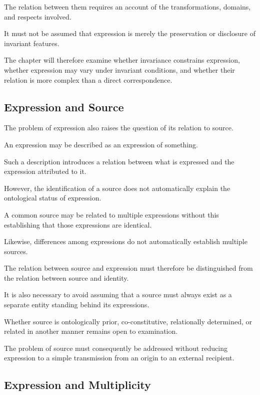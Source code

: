 The relation between them requires
an account of the transformations,
domains, and respects involved.

It must not be assumed that expression
is merely the preservation or disclosure
of invariant features.

The chapter will therefore examine
whether invariance constrains expression,
whether expression may vary under
invariant conditions, and whether
their relation is more complex than
a direct correspondence.

\subsection{Expression and Source}

The problem of expression also raises
the question of its relation to source.

An expression may be described as
an expression of something.

Such a description introduces a relation
between what is expressed and the
expression attributed to it.

However, the identification of a source
does not automatically explain the
ontological status of expression.

A common source may be related to
multiple expressions without this
establishing that those expressions
are identical.

Likewise, differences among expressions
do not automatically establish multiple
sources.

The relation between source and expression
must therefore be distinguished from
the relation between source and identity.

It is also necessary to avoid assuming
that a source must always exist as
a separate entity standing behind
its expressions.

Whether source is ontologically prior,
co-constitutive, relationally determined,
or related in another manner remains
open to examination.

The problem of source must consequently
be addressed without reducing expression
to a simple transmission from an origin
to an external recipient.

\subsection{Expression and Multiplicity}

